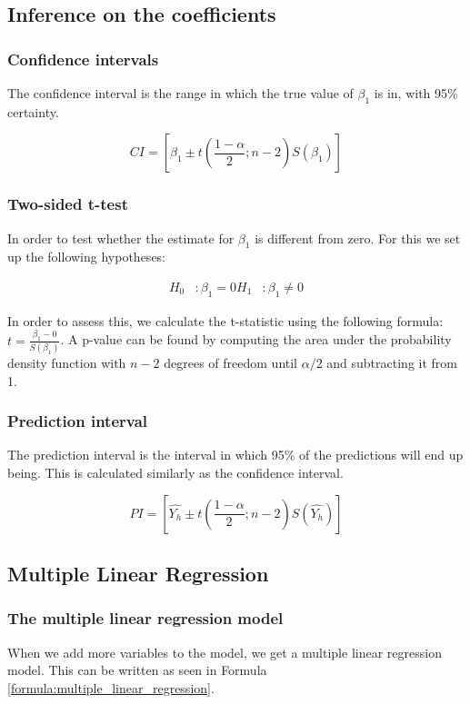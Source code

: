 \subsection{Inference on the coefficients}
\subsubsection{Confidence intervals}

The confidence interval is the range in which the true value of $\beta_1$ is in, with 95\% certainty.

\begin{equation}
    CI = \left[\beta_1 \pm t(\frac{1 - \alpha}{2}; n-2) S(\beta_1) \right]
\end{equation}

\subsubsection{Two-sided t-test}
In order to test whether the estimate for $\beta_1$ is different from zero.
For this we set up the following hypotheses:

\begin{align}
    H_0&: \beta_1 = 0
    H_1&: \beta_1 \ne 0
\end{align}

In order to assess this, we calculate the t-statistic using the following formula: $t = \frac{\beta_1 - 0}{S(\beta_1)}$.
A p-value can be found by computing the area under the probability density function with $n-2$ degrees of freedom until $\alpha / 2$ and subtracting it from 1.

\subsubsection{Prediction interval}
The prediction interval is the interval in which 95\% of the predictions will end up being.
This is calculated similarly as the confidence interval.

\begin{equation}
    PI = \left[\hat{Y_h} \pm t(\frac{1 - \alpha}{2}; n-2) S(\hat{Y_h}) \right]
\end{equation}

\subsection{Multiple Linear Regression}
\subsubsection{The multiple linear regression model}
When we add more variables to the model, we get a multiple linear regression model.
This can be written as seen in Formula \ref{formula:multiple_linear_regression}.

